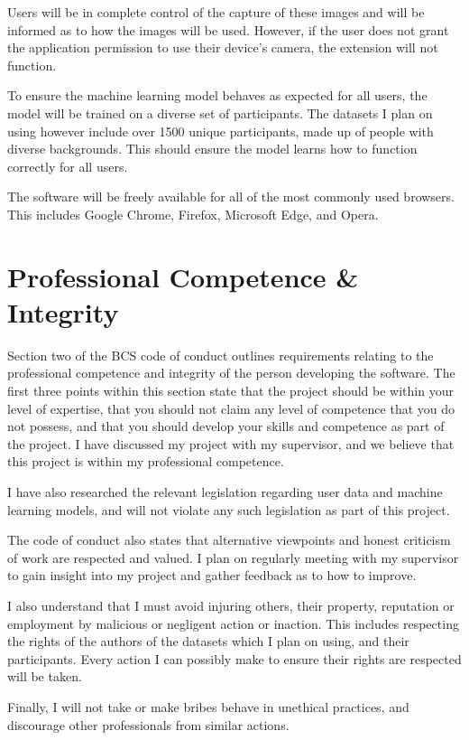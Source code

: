 \documentclass{report}
\begin{document}
Users will be in complete control of the capture of these images and will be informed as to how the images will be used. However, if the user does not grant the application permission to use their device's camera, the extension will not function. 

To ensure the machine learning model behaves as expected for all users, the model will be trained on a diverse set of participants. The datasets I plan on using however include over 1500 unique participants, made up of people with diverse backgrounds. This should ensure the model learns how to function correctly for all users. 

The software will be freely available for all of the most commonly used browsers. This includes Google Chrome, Firefox, Microsoft Edge, and Opera. 

\section{Professional Competence \& Integrity}   

Section two of the BCS code of conduct outlines requirements relating to the professional competence and integrity of the person developing the software. The first three points within this section state that the project should be within your level of expertise, that you should not claim any level of competence that you do not possess, and that you should develop your skills and competence as part of the project. I have discussed my project with my supervisor, and we believe that this project is within my professional competence.

I have also researched the relevant legislation regarding user data and machine learning models, and will not violate any such legislation as part of this project. 

The code of conduct also states that alternative viewpoints and honest criticism of work are respected and valued. I plan on regularly meeting with my supervisor to gain insight into my project and gather feedback as to how to improve. 

I also understand that I must avoid injuring others, their property, reputation or employment by malicious or negligent action or inaction. This includes respecting the rights of the authors of the datasets which I plan on using, and their participants. Every action I can possibly make to ensure their rights are respected will be taken. 

Finally, I will not take or make bribes behave in unethical practices, and discourage other professionals from similar actions.  
\end{document}

